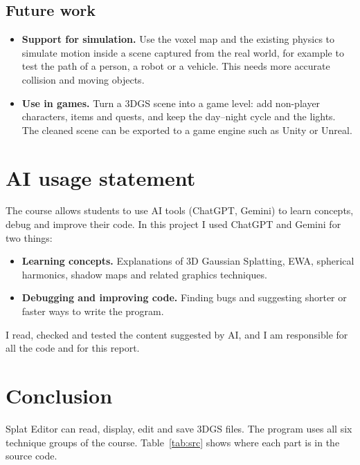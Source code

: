 \documentclass[9pt,twocolumn,a4paper]{extarticle}
\begin{document}
\subsection{Future work}
\begin{itemize}\itemsep0pt
\item \textbf{Support for simulation.} Use the voxel map and the existing physics to simulate motion inside a scene captured from the real world, for example to test the path of a person, a robot or a vehicle. This needs more accurate collision and moving objects.
\item \textbf{Use in games.} Turn a 3DGS scene into a game level: add non-player characters, items and quests, and keep the day--night cycle and the lights. The cleaned scene can be exported to a game engine such as Unity or Unreal.
\end{itemize}

\section{AI usage statement}
\label{chap:ai}
The course allows students to use AI tools (ChatGPT, Gemini) to learn concepts, debug and improve their code. In this project I used ChatGPT and Gemini for two things:
\begin{itemize}\itemsep0pt
\item \textbf{Learning concepts.} Explanations of 3D Gaussian Splatting, EWA, spherical harmonics, shadow maps and related graphics techniques.
\item \textbf{Debugging and improving code.} Finding bugs and suggesting shorter or faster ways to write the program.
\end{itemize}
I read, checked and tested the content suggested by AI, and I am responsible for all the code and for this report.

\section{Conclusion}
\label{chap:end}
Splat Editor can read, display, edit and save 3DGS files. The program uses all six technique groups of the course. Table~\ref{tab:src} shows where each part is in the source code.
\end{document}
